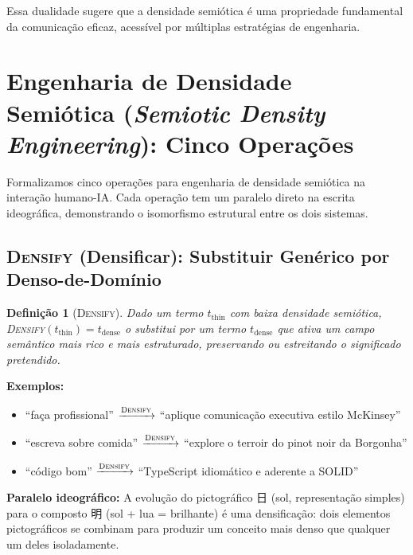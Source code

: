 \documentclass[12pt,a4paper]{article}
\newcommand{\cjk}[1]{{\cjkfont #1}}
\newtheorem{definition}{Definição}[section]
\begin{document}
Essa dualidade sugere que a densidade semiótica é uma propriedade fundamental da comunicação eficaz, acessível por múltiplas estratégias de engenharia.


\section{Engenharia de Densidade Semiótica (\textit{Semiotic Density Engineering}): Cinco Operações}
\label{sec:operations}

Formalizamos cinco operações para engenharia de densidade semiótica na interação humano-IA.
Cada operação tem um paralelo direto na escrita ideográfica, demonstrando o isomorfismo estrutural entre os dois sistemas.

\subsection{\textsc{Densify} (Densificar): Substituir Genérico por Denso-de-Domínio}
\label{subsec:densify}

\begin{definition}[\textsc{Densify}]
Dado um termo $t_{\text{thin}}$ com baixa densidade semiótica, \textsc{Densify}$(t_{\text{thin}}) = t_{\text{dense}}$ o substitui por um termo $t_{\text{dense}}$ que ativa um campo semântico mais rico e mais estruturado, preservando ou estreitando o significado pretendido.
\end{definition}

\textbf{Exemplos:}
\begin{itemize}
  \item ``faça profissional'' $\xrightarrow{\textsc{Densify}}$ ``aplique comunicação executiva estilo McKinsey''
  \item ``escreva sobre comida'' $\xrightarrow{\textsc{Densify}}$ ``explore o terroir do pinot noir da Borgonha''
  \item ``código bom'' $\xrightarrow{\textsc{Densify}}$ ``TypeScript idiomático e aderente a SOLID''
\end{itemize}

\textbf{Paralelo ideográfico:}
A evolução do pictográfico \cjk{日} (sol, representação simples) para o composto \cjk{明} (sol + lua = brilhante) é uma densificação: dois elementos pictográficos se combinam para produzir um conceito mais denso que qualquer um deles isoladamente.
\end{document}
